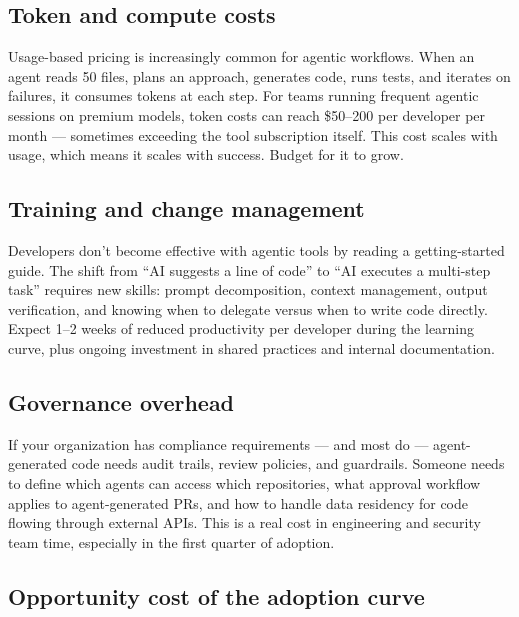 \documentclass[
  a4paper,
  DIV=11,
  numbers=noendperiod]{scrreprt}
\begin{document}
\subsection{Token and compute costs}\label{token-and-compute-costs}

Usage-based pricing is increasingly common for agentic workflows. When
an agent reads 50 files, plans an approach, generates code, runs tests,
and iterates on failures, it consumes tokens at each step. For teams
running frequent agentic sessions on premium models, token costs can
reach \$50--200 per developer per month --- sometimes exceeding the tool
subscription itself. This cost scales with usage, which means it scales
with success. Budget for it to grow.

\subsection{Training and change
management}\label{training-and-change-management}

Developers don't become effective with agentic tools by reading a
getting-started guide. The shift from ``AI suggests a line of code'' to
``AI executes a multi-step task'' requires new skills: prompt
decomposition, context management, output verification, and knowing when
to delegate versus when to write code directly. Expect 1--2 weeks of
reduced productivity per developer during the learning curve, plus
ongoing investment in shared practices and internal documentation.

\subsection{Governance overhead}\label{governance-overhead}

If your organization has compliance requirements --- and most do ---
agent-generated code needs audit trails, review policies, and
guardrails. Someone needs to define which agents can access which
repositories, what approval workflow applies to agent-generated PRs, and
how to handle data residency for code flowing through external APIs.
This is a real cost in engineering and security team time, especially in
the first quarter of adoption.

\subsection{Opportunity cost of the adoption
curve}\label{opportunity-cost-of-the-adoption-curve}
\end{document}
